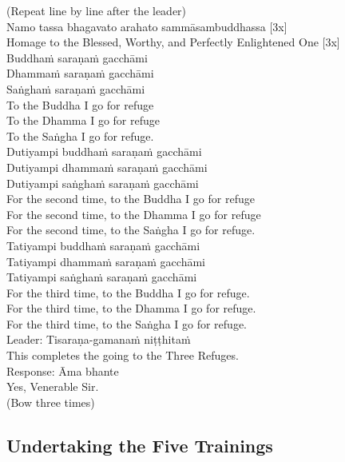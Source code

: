(Repeat line by line after the leader)\\
Namo tassa bhagavato arahato sammāsambuddhassa [3x]\\
Homage to the Blessed, Worthy, and Perfectly Enlightened One [3x]\\
Buddhaṁ saraṇaṁ gacchāmi\\
Dhammaṁ saraṇaṁ gacchāmi\\
Saṅghaṁ saraṇaṁ gacchāmi\\
To the Buddha I go for refuge\\
To the Dhamma I go for refuge\\
To the Saṅgha I go for refuge.\\
Dutiyampi buddhaṁ saraṇaṁ gacchāmi\\
Dutiyampi dhammaṁ saraṇaṁ gacchāmi\\
Dutiyampi saṅghaṁ saraṇaṁ gacchāmi\\
For the second time, to the Buddha I go for refuge\\
For the second time, to the Dhamma I go for refuge\\
For the second time, to the Saṅgha I go for refuge.\\
Tatiyampi buddhaṁ saraṇaṁ gacchāmi\\
Tatiyampi dhammaṁ saraṇaṁ gacchāmi\\
Tatiyampi saṅghaṁ saraṇaṁ gacchāmi\\
For the third time, to the Buddha I go for refuge.\\
For the third time, to the Dhamma I go for refuge.\\
For the third time, to the Saṅgha I go for refuge.\\
Leader:         Tisaraṇa-gamanaṁ niṭṭhitaṁ\\
This completes the going to the Three Refuges.\\
Response:     Āma bhante\\
Yes, Venerable Sir.\\


(Bow three times)\\

\subsection{Undertaking the Five Trainings}


